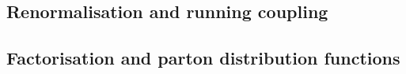 
\subsection{Renormalisation and running coupling}
\subsection{Factorisation and parton distribution functions}
